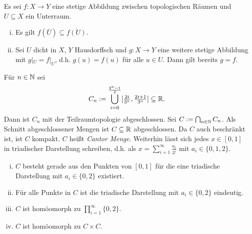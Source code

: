 \begin{aufgabe} Es sei $f\colon X\to Y$ eine stetige Abbildung zwischen topologischen Räumen und $U\subseteq X$ ein Unterraum.
\begin{enumerate}[i)]
	\item Es gilt $f(\overline{U})\subseteq\overline{f(U)}$.
	\item Sei $U$ dicht in $X$, $Y$ Hausdorffsch und $g\colon X\to Y$ eine weitere stetige Abbildung mit $g|_U=f|_U$, d.h. $g(u)=f(u)$ für alle $u\in U$. Dann gilt bereits $g=f$.
\end{enumerate}
\end{aufgabe}
\begin{aufgabe}[15 Punkte] Für $n\in\mathbb{N}$ sei \[C_n:=\bigcup_{i=0}^{\frac{3^n-1}{2}}[\tfrac{2i}{3^n},\tfrac{2i+1}{3^n}]\subseteq \mathbb{R}.\] Dann ist $C_n$ mit der Teilraumtopologie abgeschlossen. Sei $C:=\bigcap_{n\in\mathbb{N}}C_n$. Als Schnitt abgeschlossener Mengen ist $C\subseteq \mathbb{R}$ abgeschlossen. Da $C$ auch beschränkt ist, ist $C$ kompakt. $C$ heißt \emph{Cantor Menge}. Weiterhin lässt sich jedes $x\in[0,1]$ in triadischer Darstellung schreiben, d.h. als $x=\sum_{i=1}^\infty\tfrac{a_i}{3^i}$ mit $a_i\in\{0,1,2\}$.
\begin{enumerate}[i)]
	\item $C$ besteht gerade aus den Punkten von $[0,1]$ für die eine triadische Darstellung mit $a_i\in\{0,2\}$ existiert.
	\item Für alle Punkte in $C$ ist die triadische Darstellung mit $a_i\in\{0,2\}$ eindeutig.
	\item $C$ ist homöomorph zu $\prod_{i=1}^\infty\{0,2\}$.
	\item $C$ ist homöomorph zu $C\times C$.
\end{enumerate}
\end{aufgabe}
